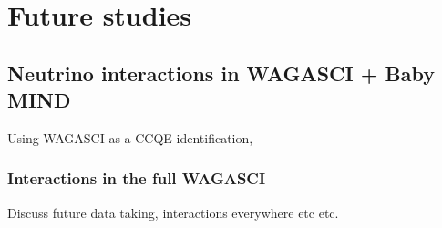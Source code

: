 \pagebreak
\section{Future studies}

\subsection{Neutrino interactions in WAGASCI + Baby MIND}

Using WAGASCI as a CCQE identification,

\subsubsection{Interactions in the full WAGASCI}

Discuss future data taking, interactions everywhere etc etc.




